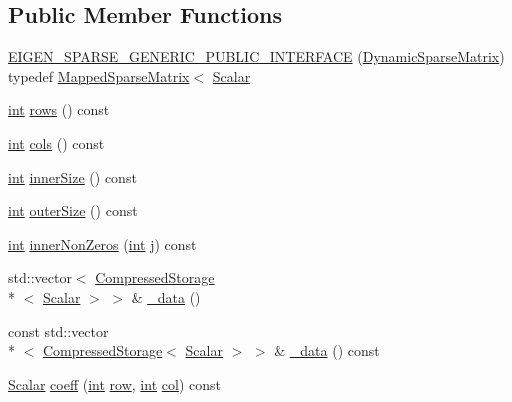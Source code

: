 \subsection*{Public Member Functions}
\begin{DoxyCompactItemize}
\item 
\hyperlink{class_dynamic_sparse_matrix_a825b78d0a22117193c9a556a597a9726}{E\-I\-G\-E\-N\-\_\-\-S\-P\-A\-R\-S\-E\-\_\-\-G\-E\-N\-E\-R\-I\-C\-\_\-\-P\-U\-B\-L\-I\-C\-\_\-\-I\-N\-T\-E\-R\-F\-A\-C\-E} (\hyperlink{class_dynamic_sparse_matrix}{Dynamic\-Sparse\-Matrix}) typedef \hyperlink{class_mapped_sparse_matrix}{Mapped\-Sparse\-Matrix}$<$ \hyperlink{class_sparse_matrix_base_af39d70f2b7e775e9e17b666cd24128c8}{Scalar}
\item 
\hyperlink{ioapi_8h_a787fa3cf048117ba7123753c1e74fcd6}{int} \hyperlink{class_dynamic_sparse_matrix_abe44ef949173f825ff346e096bb074a4}{rows} () const 
\item 
\hyperlink{ioapi_8h_a787fa3cf048117ba7123753c1e74fcd6}{int} \hyperlink{class_dynamic_sparse_matrix_a227b1cc3a3e46b5483a9d8881300c3a1}{cols} () const 
\item 
\hyperlink{ioapi_8h_a787fa3cf048117ba7123753c1e74fcd6}{int} \hyperlink{class_dynamic_sparse_matrix_adc3a7854d255576150092c7078c99355}{inner\-Size} () const 
\item 
\hyperlink{ioapi_8h_a787fa3cf048117ba7123753c1e74fcd6}{int} \hyperlink{class_dynamic_sparse_matrix_acd54a8b1b1a26df65a17a459a09f9958}{outer\-Size} () const 
\item 
\hyperlink{ioapi_8h_a787fa3cf048117ba7123753c1e74fcd6}{int} \hyperlink{class_dynamic_sparse_matrix_af4365829fe97f1963003c508413e7133}{inner\-Non\-Zeros} (\hyperlink{ioapi_8h_a787fa3cf048117ba7123753c1e74fcd6}{int} j) const 
\item 
std\-::vector$<$ \hyperlink{class_compressed_storage}{Compressed\-Storage}\\*
$<$ \hyperlink{class_sparse_matrix_base_af39d70f2b7e775e9e17b666cd24128c8}{Scalar} $>$ $>$ \& \hyperlink{class_dynamic_sparse_matrix_a881ecf23d26eddc582d88b58d634310c}{\-\_\-data} ()
\item 
const std\-::vector\\*
$<$ \hyperlink{class_compressed_storage}{Compressed\-Storage}$<$ \hyperlink{class_sparse_matrix_base_af39d70f2b7e775e9e17b666cd24128c8}{Scalar} $>$ $>$ \& \hyperlink{class_dynamic_sparse_matrix_a04291269ee749554724e7ca0987da09a}{\-\_\-data} () const 
\item 
\hyperlink{class_sparse_matrix_base_af39d70f2b7e775e9e17b666cd24128c8}{Scalar} \hyperlink{class_dynamic_sparse_matrix_a4a579bbd419173b1dad770ba778b53c6}{coeff} (\hyperlink{ioapi_8h_a787fa3cf048117ba7123753c1e74fcd6}{int} \hyperlink{glext_8h_a11b277b422822f784ee248b43eee3e1e}{row}, \hyperlink{ioapi_8h_a787fa3cf048117ba7123753c1e74fcd6}{int} \hyperlink{class_sparse_matrix_base_a711a8f11f5f1915057922412dac2cc25}{col}) const 

\end{DoxyCompactItemize}
